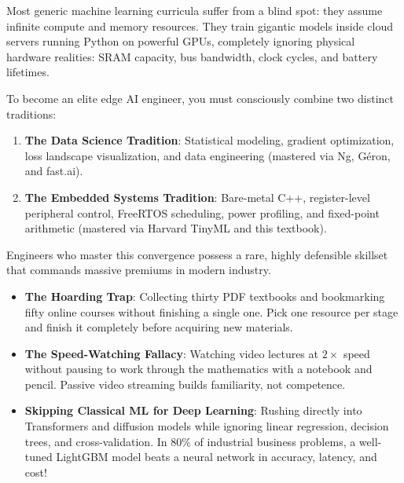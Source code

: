 \begin{iotbox}
Most generic machine learning curricula suffer from a blind spot: they assume infinite compute and memory resources. They train gigantic models inside cloud servers running Python on powerful GPUs, completely ignoring physical hardware realities: SRAM capacity, bus bandwidth, clock cycles, and battery lifetimes.

To become an elite edge AI engineer, you must consciously combine two distinct traditions:
\begin{enumerate}
    \item \textbf{The Data Science Tradition}: Statistical modeling, gradient optimization, loss landscape visualization, and data engineering (mastered via Ng, Géron, and fast.ai).
    \item \textbf{The Embedded Systems Tradition}: Bare-metal C++, register-level peripheral control, FreeRTOS scheduling, power profiling, and fixed-point arithmetic (mastered via Harvard TinyML and this textbook).
\end{enumerate}
Engineers who master this convergence possess a rare, highly defensible skillset that commands massive premiums in modern industry.
\end{iotbox}

\begin{warning}
\begin{itemize}
    \item \textbf{The Hoarding Trap}: Collecting thirty PDF textbooks and bookmarking fifty online courses without finishing a single one. Pick one resource per stage and finish it completely before acquiring new materials.
    \item \textbf{The Speed-Watching Fallacy}: Watching video lectures at $2\times$ speed without pausing to work through the mathematics with a notebook and pencil. Passive video streaming builds familiarity, not competence.
    \item \textbf{Skipping Classical ML for Deep Learning}: Rushing directly into Transformers and diffusion models while ignoring linear regression, decision trees, and cross-validation. In $80\%$ of industrial business problems, a well-tuned LightGBM model beats a neural network in accuracy, latency, and cost!
\end{itemize}
\end{warning}

